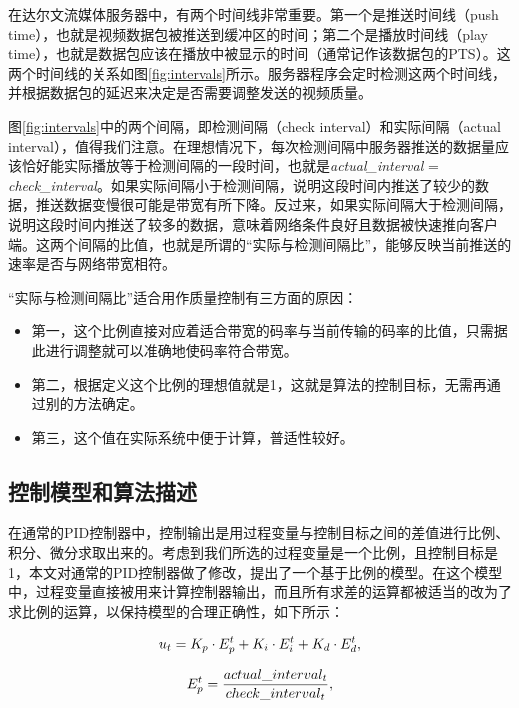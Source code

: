 在达尔文流媒体服务器中，有两个时间线非常重要。第一个是推送时间线（push time），也就是视频数据包被推送到缓冲区的时间；第二个是播放时间线（play time），也就是数据包应该在播放中被显示的时间（通常记作该数据包的PTS）。这两个时间线的关系如图\ref{fig:intervals}所示。服务器程序会定时检测这两个时间线，并根据数据包的延迟来决定是否需要调整发送的视频质量。

图\ref{fig:intervals}中的两个间隔，即检测间隔（check interval）和实际间隔（actual interval），值得我们注意。在理想情况下，每次检测间隔中服务器推送的数据量应该恰好能实际播放等于检测间隔的一段时间，也就是\textit{actual\_interval} = \textit{check\_interval}。如果实际间隔小于检测间隔，说明这段时间内推送了较少的数据，推送数据变慢很可能是带宽有所下降。反过来，如果实际间隔大于检测间隔，说明这段时间内推送了较多的数据，意味着网络条件良好且数据被快速推向客户端。这两个间隔的比值，也就是所谓的“实际与检测间隔比”，能够反映当前推送的速率是否与网络带宽相符。

“实际与检测间隔比”适合用作质量控制有三方面的原因：
\begin{itemize}
	\item 第一，这个比例直接对应着适合带宽的码率与当前传输的码率的比值，只需据此进行调整就可以准确地使码率符合带宽。
	\item 第二，根据定义这个比例的理想值就是1，这就是算法的控制目标，无需再通过别的方法确定。
	\item 第三，这个值在实际系统中便于计算，普适性较好。
\end{itemize}

\subsection{控制模型和算法描述}

在通常的PID控制器中，控制输出是用过程变量与控制目标之间的差值进行比例、积分、微分求取出来的。考虑到我们所选的过程变量是一个比例，且控制目标是1，本文对通常的PID控制器做了修改，提出了一个基于比例的模型。在这个模型中，过程变量直接被用来计算控制器输出，而且所有求差的运算都被适当的改为了求比例的运算，以保持模型的合理正确性，如下所示：

\begin{equation}
\vspace{10pt}
\label{eq:ut}
{u_t} = {K_p} \cdot E_p^t + {K_i} \cdot E_i^t + {K_d} \cdot E_d^t ,
\end{equation}

\begin{equation}
\vspace{10pt}
\label{eq:ep}
E_p^t = \frac{{actual\_interva{l_t}}}{{check\_interva{l_t}}} ,
\end{equation}

